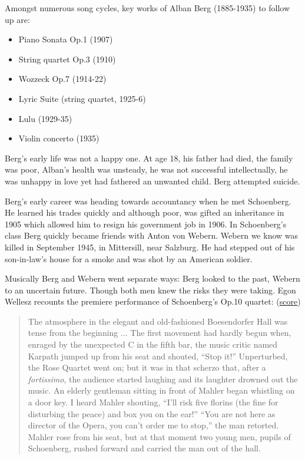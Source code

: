Amongst numerous song cycles, key works of Alban Berg (1885-1935) to follow up are:
\begin{itemize}
\item Piano Sonata Op.1 (1907)
\item String quartet Op.3 (1910)
\item Wozzeck Op.7 (1914-22)
\item Lyric Suite (string quartet, 1925-6)
\item Lulu (1929-35)
\item Violin concerto (1935) 
\end{itemize}

Berg's early life was not a happy one. At age 18, his father had died, the family was poor, Alban's health was unsteady, he was not successful intellectually, he was unhappy in love yet had fathered an unwanted child. Berg attempted suicide. 

Berg's early career was heading towards accountancy when he met Schoenberg. He learned his trades quickly and although poor, was gifted an inheritance in 1905 which allowed him to resign his government job in 1906. In Schoenberg's class Berg quickly became friends with Anton von Webern. Webern we know was killed in September 1945, in Mittersill, near Salzburg. He had stepped out of his son-in-law's house for a smoke and was shot by an American soldier. 

Musically Berg and Webern went separate ways: Berg looked to the past, Webern to an uncertain future. Though both men knew the risks they were taking. Egon Wellesz recounts the premiere performance of Schoenberg's Op.10 quartet: (\href{http://conquest.imslp.info/files/imglnks/usimg/c/c1/IMSLP29725-PMLP66179-Schoenberg_-_SQ_No._2_score.pdf}{score})

\begin{quotation}
The atmosphere in the elegant and old-fashioned Boesendorfer Hall was tense from the beginning ... The first movement had hardly begun when, enraged by the unexpected C in the fifth bar, the music critic named Karpath jumped up from his seat and shouted, ``Stop it!'' Unperturbed, the Rose Quartet went on; but it was in that scherzo that, after a \textit{fortissimo}, the audience started laughing and its laughter drowned out the music. An elderly gentleman sitting in front of Mahler began whistling on a door key. I heard Mahler shouting, ``I'll risk five florins (the fine for disturbing the peace) and box you on the ear!'' ``You are not here as director of the Opera, you can't order me to stop,'' the man retorted. Mahler rose from his seat, but at that moment two young men, pupils of Schoenberg, rushed forward and carried the man out of the hall.
\end{quotation}

